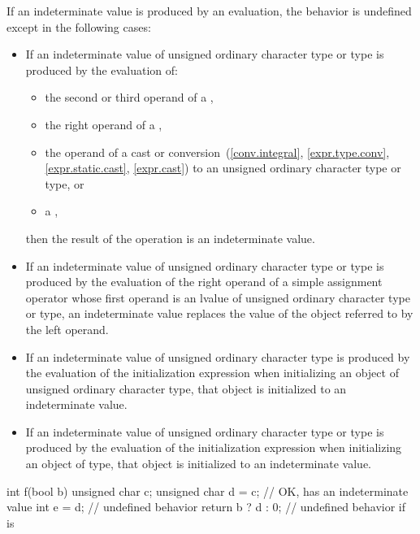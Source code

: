 \pnum
If an indeterminate value is produced by an evaluation,
the behavior is undefined except in the following cases:
\begin{itemize}
\item
  If an indeterminate value of
  unsigned ordinary character type
  or  type
  is produced by the evaluation of:
  \begin{itemize}
  \item
    the second or third operand of a ,
  \item
    the right operand of a ,
  \item
    the operand of a cast or conversion~(\ref{conv.integral},
    \ref{expr.type.conv}, \ref{expr.static.cast}, \ref{expr.cast})
    to an unsigned ordinary character type
    or  type, or
  \item
    a ,
  \end{itemize}
  then the result of the operation is an indeterminate value.
\item
  If an indeterminate value of
  unsigned ordinary character type or  type
  is produced by the evaluation of
  the right operand of a simple assignment operator
  whose first operand is an lvalue of
  unsigned ordinary character type or  type,
  an indeterminate value replaces
  the value of the object referred to by the left operand.
\item
  If an indeterminate value of unsigned ordinary character type
  is produced by the evaluation of the initialization expression
  when initializing an object of unsigned ordinary character type,
  that object is initialized to an indeterminate
  value.
\item
  If an indeterminate value of
  unsigned ordinary character type or  type
  is produced by the evaluation of the initialization expression
  when initializing an object of  type,
  that object is initialized to an indeterminate value.
\end{itemize}
\begin{example}
\begin{codeblock}
int f(bool b) {
  unsigned char c;
  unsigned char d = c;          // OK,  has an indeterminate value
  int e = d;                    // undefined behavior
  return b ? d : 0;             // undefined behavior if  is 
}
\end{codeblock}
\end{example}

